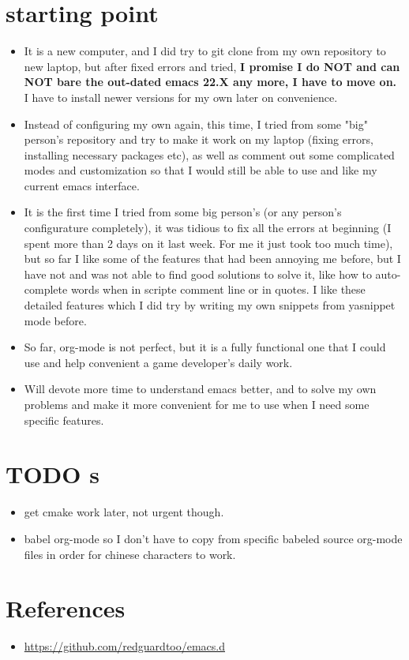 \documentclass[9pt, b5paper]{article}
\begin{document}
\section{starting point}
\label{sec:org5f6abb4}
\begin{itemize}
\item It is a new computer, and I did try to git clone from my own repository to new laptop, but after fixed errors and tried, \textbf{I promise I do NOT and can NOT bare the out-dated emacs 22.X any more, I have to move on.} I have to install newer versions for my own later on convenience.
\item Instead of configuring my own again, this time, I tried from some "big" person's repository and try to make it work on my laptop (fixing errors, installing necessary packages etc), as well as comment out some complicated modes and customization so that I would still be able to use and like my current emacs interface.
\item It is the first time I tried from some big person's (or any person's configurature completely), it was tidious to fix all the errors at beginning (I spent more than 2 days on it last week. For me it just took too much time), but so far I like some of the features that had been annoying me before, but I have not and was not able to find good solutions to solve it, like how to auto-complete words when in scripte comment line or in quotes. I like these detailed features which I did try by writing my own snippets from yasnippet mode before.
\item So far, org-mode is not perfect, but it is a fully functional one that I could use and help convenient a game developer's daily work.
\item Will devote more time to understand emacs better, and to solve my own problems and make it more convenient for me to use when I need some specific features.
\end{itemize}

\section{{\bfseries\sffamily TODO} s}
\label{sec:org8073805}
\begin{itemize}
\item get cmake work later, not urgent though.
\item babel org-mode so I don't have to copy from specific babeled source org-mode files in order for chinese characters to work.
\end{itemize}

\section{References}
\label{sec:org0b8086e}
\begin{itemize}
\item \url{https://github.com/redguardtoo/emacs.d}
\end{itemize}
\end{document}
